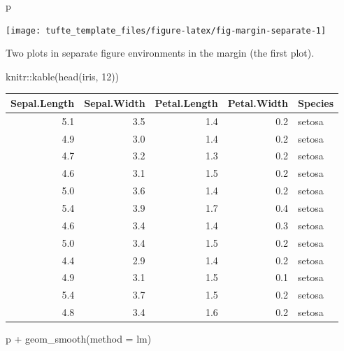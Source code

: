 \documentclass[a4paper,14pt]{tufte-handout}
\newenvironment{Shaded}{}{}
\newcommand{\AttributeTok}[1]{\textcolor[rgb]{0.49,0.56,0.16}{#1}}
\newcommand{\DecValTok}[1]{\textcolor[rgb]{0.25,0.63,0.44}{#1}}
\newcommand{\FunctionTok}[1]{\textcolor[rgb]{0.02,0.16,0.49}{#1}}
\newcommand{\NormalTok}[1]{#1}
\newcommand{\SpecialCharTok}[1]{\textcolor[rgb]{0.25,0.44,0.63}{#1}}
\newcommand{\StringTok}[1]{\textcolor[rgb]{0.25,0.44,0.63}{#1}}
\begin{document}
\begin{Shaded}
\begin{Highlighting}[numbers=left,,]
\NormalTok{p}
\end{Highlighting}
\end{Shaded}

\begin{marginfigure}

{\centering \texttt{[image: tufte\_template\_files/figure-latex/fig-margin-separate-1]} 

}

\caption[Two plots in separate figure environments in the margin (the first plot)]{Two plots in separate figure environments in the margin (the first plot).}\label{fig:fig-margin-separate-1}
\end{marginfigure}

\begin{Shaded}
\begin{Highlighting}[numbers=left,,]
\NormalTok{knitr}\SpecialCharTok{::}\FunctionTok{kable}\NormalTok{(}\FunctionTok{head}\NormalTok{(iris, }\DecValTok{12}\NormalTok{))}
\end{Highlighting}
\end{Shaded}

\begin{tabular}{r|r|r|r|l}
\hline
Sepal.Length & Sepal.Width & Petal.Length & Petal.Width & Species\\
\hline
5.1 & 3.5 & 1.4 & 0.2 & setosa\\
\hline
4.9 & 3.0 & 1.4 & 0.2 & setosa\\
\hline
4.7 & 3.2 & 1.3 & 0.2 & setosa\\
\hline
4.6 & 3.1 & 1.5 & 0.2 & setosa\\
\hline
5.0 & 3.6 & 1.4 & 0.2 & setosa\\
\hline
5.4 & 3.9 & 1.7 & 0.4 & setosa\\
\hline
4.6 & 3.4 & 1.4 & 0.3 & setosa\\
\hline
5.0 & 3.4 & 1.5 & 0.2 & setosa\\
\hline
4.4 & 2.9 & 1.4 & 0.2 & setosa\\
\hline
4.9 & 3.1 & 1.5 & 0.1 & setosa\\
\hline
5.4 & 3.7 & 1.5 & 0.2 & setosa\\
\hline
4.8 & 3.4 & 1.6 & 0.2 & setosa\\
\hline
\end{tabular}

\begin{Shaded}
\begin{Highlighting}[numbers=left,,]
\NormalTok{p }\SpecialCharTok{+} \FunctionTok{geom\_smooth}\NormalTok{(}\AttributeTok{method =} \StringTok{\textquotesingle{}lm\textquotesingle{}}\NormalTok{)}
\end{Highlighting}
\end{Shaded}
\end{document}
